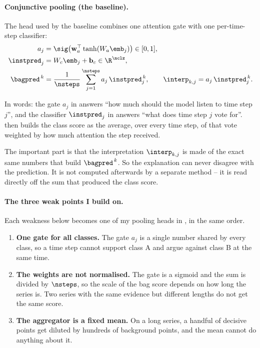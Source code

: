 \paragraph{Conjunctive pooling (the baseline).}
The head used by the \millet{} baseline combines one attention gate with one per-time-step
classifier:
\begin{align}
  a_j       &= \sig\!\left(\mathbf{w}_a^\top \tanh(W_a \emb_j)\right) \in [0,1],
  \label{eq:conj_gate}\\
  \instpred_j &= W_c \emb_j + \mathbf{b}_c \in \R^{\nclz},
  \label{eq:conj_inst}\\
  \bagpred^{\,k} &= \frac{1}{\nsteps} \sum_{j=1}^{\nsteps} a_j\, \instpred_j^{\,k},
  \qquad
  \interp_{k,j} = a_j\, \instpred_j^{\,k}.
  \label{eq:conj_bag}
\end{align}

In words: the gate $a_j$ in  answers ``how much should the model listen to time
step $j$'', and the classifier $\instpred_j$ in  answers ``what does time step
$j$ vote for''.  then builds the class score as the average, over every time step,
of that vote weighted by how much attention the step received.

The important part is that the interpretation $\interp_{k,j}$ is made of the exact same numbers that
build $\bagpred^{\,k}$. So the explanation can never disagree with the prediction. It is not
computed afterwards by a separate method -- it is read directly off the sum that produced the class
score.

\paragraph{The three weak points I build on.}
Each weakness below becomes one of my pooling heads in , in the same order.

\begin{enumerate}\itemsep3pt
  \item \textbf{One gate for all classes.} The gate $a_j$ is a single number shared by every class,
        so a time step cannot support class A and argue against class B at the same time.
  \item \textbf{The weights are not normalised.} The gate is a sigmoid and the sum is divided by
        $\nsteps$, so the scale of the bag score depends on how long the series is. Two series with
        the same evidence but different lengths do not get the same score.
  \item \textbf{The aggregator is a fixed mean.} On a long series, a handful of decisive points get
        diluted by hundreds of background points, and the mean cannot do anything about it.
\end{enumerate}

